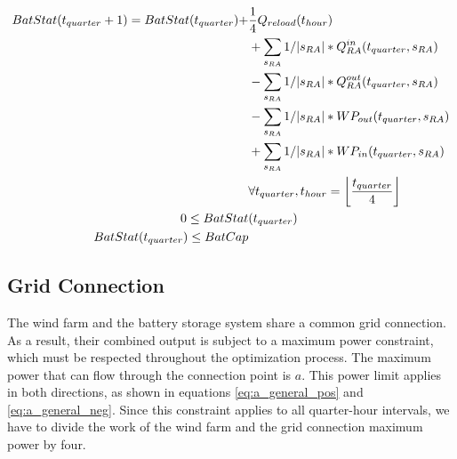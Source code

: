 \begin{alignat}{3}
	BatStat(t_{quarter} + 1)  = BatStat(t_{quarter}) + & \frac{1}{4} Q_{reload}(t_{hour})\notag                                                               \\
	                                                   & +\sum_{s_{RA}}1/|s_{RA}|  * Q^{in}_{RA}(t_{quarter}, s_{RA})\notag                                   \\
	                                                   & - \sum_{s_{RA}}1/|s_{RA}|  * Q^{out}_{RA}(t_{quarter}, s_{RA})\notag                                 \\
	                                                   & - \sum_{s_{RA}}1/|s_{RA}|  * WP_{out}(t_{quarter}, s_{RA})\notag                                     \\
	                                                   & + \sum_{s_{RA}}1/|s_{RA}|  * WP_{in}(t_{quarter}, s_{RA})\notag                                      \\
	                                                   & \forall t_{quarter}, t_{hour} = \left\lfloor \frac{t_{quarter}}{4} \right\rfloor  \label{eq:BatStat} \\
	0 \leq  BatStat                                    & (t_{quarter}) 			\label{eq:BatStat_nonNeg}                                                           \\
	BatStat(t_{quarter}) \leq  BatCap                  & \label{eq:BatStat_cap}
\end{alignat}


\subsection{Grid Connection}
The wind farm and the battery storage system
share a common grid connection. As a result, their combined output is subject to
a maximum power constraint, which must be respected throughout the optimization process.
The maximum power that can flow through the connection point is $a$. This power limit applies in both directions,
as shown in equations \ref{eq:a_general_pos} and \ref{eq:a_general_neg}. Since this constraint applies to all quarter-hour
intervals, we have to divide the work of the wind farm and the grid connection maximum power by four.

